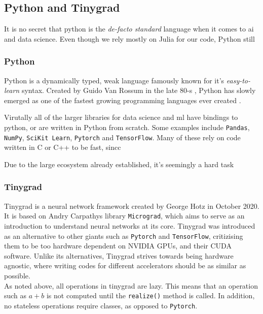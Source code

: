\subsection{Python and Tinygrad}
\label{back:tiny}

It is no secret that python is the \textit{de-facto standard} language when it comes to \acrshort{ai} and data science. Even though we rely mostly on Julia for our code, Python still 




\subsubsection{Python}

Python is a dynamically typed, weak language famously known for it's \textit{easy-to-learn} syntax. Created by Guido Van Rossum in the late 80-s \cite{python}, Python has slowly emerged as one of the fastest growing programming languages ever created \cite{srinath2017python}. 

Virutally all of the larger libraries for data science and \acrlong{ml} have bindings to \gls{python}, or are written in Python from scratch. Some examples include \texttt{Pandas}, \texttt{NumPy}, \texttt{SciKit Learn}, \texttt{Pytorch} and \texttt{TensorFlow}. Many of these rely on code written in C or C++ to be fast, sincc

Due to the large ecosystem already established, it's seemingly a hard task  \\

\subsubsection{Tinygrad}

Tinygrad is a neural network framework created by George Hotz in October 2020. It is based on Andry Carpathys library \texttt{Micrograd}, which aims to serve as an introduction to understand neural networks at its core. Tinygrad was introduced as an alternative to other giants such as \texttt{Pytorch} and \texttt{TensorFlow}, critizising them to be too hardware dependent on NVIDIA GPUs, and their CUDA software. Unlike its alternatives, Tinygrad strives towards being hardware agnostic, where writing codes for different accelerators should be as similar as possible. \\

As noted above, all operations in tinygrad are lazy. This means that an operation such as $a+b$ is not computed until the \texttt{realize()} method is called. In addition, no stateless operations require classes, as opposed to \texttt{Pytorch}. \\

